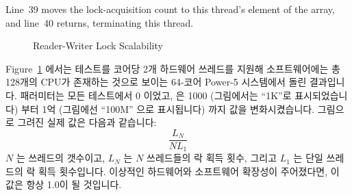 Line~39 moves the lock-acquisition count to this thread's element of the
 array, and line~40 returns, terminating this thread.
\fi

\begin{figure}[tb]
\centering
{}
\caption{Reader-Writer Lock Scalability}
\label{fig:intro:Reader-Writer Lock Scalability}
\end{figure}

Figure~\ref{fig:intro:Reader-Writer Lock Scalability} 에서는 테스트를 코어당
2개 하드웨어 쓰레드를 지원해 소프트웨어에는 총 128개의 CPU가 존재하는 것으로
보이는 64-코어 Power-5 시스템에서 돌린 결과입니다.
 패러미터는 모든 테스트에서 0 이었고,  은 1000
(그림에서는 ``1K''로 표시되었습니다) 부터 1억 (그림에선 ``100M'' 으로
표시됩니다) 까지 값을 변화시켰습니다.
그림으로 그려진 실제 값은 다음과 같습니다:
\begin{equation}
	\frac{L_N}{N L_1}
\end{equation}
$N$ 는 쓰레드의 갯수이고, $L_N$ 는 $N$ 쓰레드들의 락 획득 횟수, 그리고 $L_1$ 는
단일 쓰레드의 락 획득 횟수입니다.
이상적인 하드웨어와 소프트웨어 확장성이 주어졌다면, 이 값은 항상 1.0이 될
것입니다.

